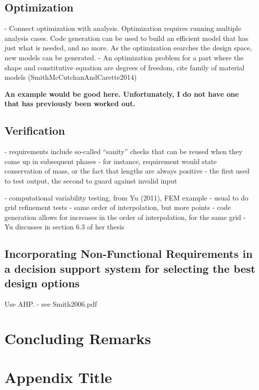 \documentclass[10pt, preprint]{sigplanconf}
\begin{document}
\subsection{Optimization} \label{subsec:optimization}

- Connect optimization with analysis.  Optimization requires running multiple
analysis cases.  Code generation can be used to build an efficient model that
has just what is needed, and no more.  As the optimization searches the design
space, new models can be generated.  - An optimization problem for a part where
the shape and constitutive equation are degrees of freedom, cite family of
material models (SmithMcCutchanAndCarette2014)

\textbf{An example would be good here.  Unfortunately, I do not have one that
  has previously been worked out.}

\subsection{Verification} \label{subsec:verification}

- requirements include so-called “sanity” checks that can be reused when they
come up in subsequent phases - for instance, requirement would state
conservation of mass, or the fact that lengths are always positive - the first
used to test output, the second to guard against invalid input

- computational variability testing, from Yu (2011), FEM example - usual to do
grid refinement tests - same order of interpolation, but more points - code
generation allows for increases in the order of interpolation, for the same grid
- Yu discusses in section 6.3 of her thesis

\subsection{Incorporating Non-Functional Requirements in a decision support
  system for selecting the best design options} \label{subsec:incorporating}

Use AHP. - see Smith2006.pdf

\section{Concluding Remarks} \label{sec:concluding}

\appendix
\section{Appendix Title}
\end{document}

